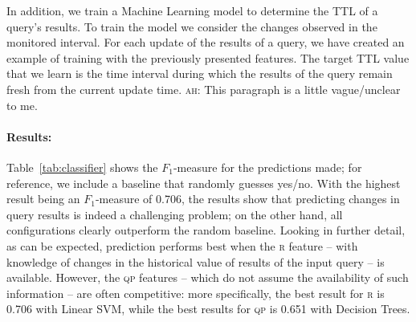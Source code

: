 \documentclass[runningheads]{llncs}
\newcommand{\ah}[1]{{\color{blue}\textsc{ah:} #1}}
\begin{document}


In addition, we train a Machine Learning model to determine the TTL of a query's results. To train the model we consider the changes observed in the monitored interval. For each update of the results of a query, we have created an example of training with the previously presented features. The target TTL value that we learn is the time interval during which the results of the query remain fresh from the current update time. \ah{This paragraph is a little vague/unclear to me.}

\paragraph{Results:} Table~\ref{tab:classifier} shows the $F_1$-measure for the predictions made; for reference, we include a baseline that randomly guesses yes/no. With the highest result being an $F_1$-measure of 0.706, the results show that predicting changes in query results is indeed a challenging problem; on the other hand, all configurations clearly outperform the random baseline. Looking in further detail, as can be expected, prediction performs best when the \textsc{r} feature -- with knowledge of changes in the historical value of results of the input query -- is available. However, the \textsc{qp} features -- which do not assume the availability of such information -- are often competitive: more specifically, the best result for \textsc{r} is 0.706 with Linear SVM, while the best results for \textsc{qp} is 0.651 with Decision Trees. 
\end{document}
